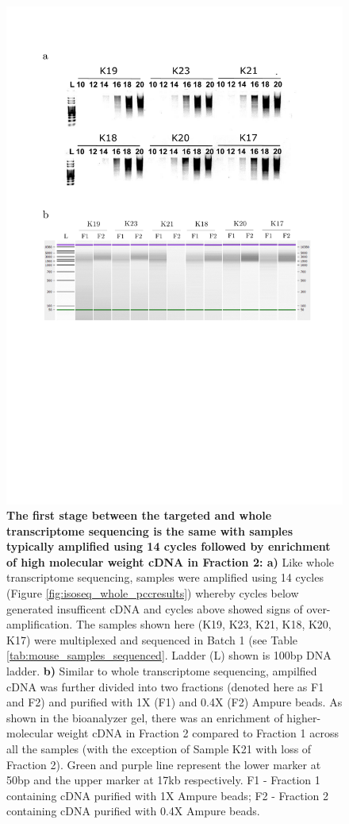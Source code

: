 \begin{figure}[htp]
	\centering
	\vspace{20pt}
	\includegraphics[page=1,trim={0 16cm 0 4cm},clip,scale = 0.45]{Figures/TargetedLabResults.pdf}
	\captionsetup{width=0.95\textwidth}
	\caption[Iso-Seq Targeted Transcriptome - cDNA amplification and purification]%
	{\textbf{The first stage between the targeted and whole transcriptome sequencing is the same with samples typically amplified using 14 cycles followed by enrichment of high molecular weight cDNA in Fraction 2: a)} Like whole transcriptome sequencing, samples were amplified using 14 cycles (Figure \ref{fig:isoseq_whole_pccresults}) whereby cycles below generated insufficent cDNA and cycles above showed signs of over-amplification. The samples shown here (K19, K23, K21, K18, K20, K17) were multiplexed and sequenced in Batch 1 (see Table \ref{tab:mouse_samples_sequenced}. Ladder (L) shown is 100bp DNA ladder. \textbf{b)} Similar to whole transcriptome sequencing, ampilfied cDNA was further divided into two fractions (denoted here as F1 and F2) and purified with 1X (F1) and 0.4X (F2) Ampure beads. As shown in the bioanalyzer gel, there was an enrichment of higher-molecular weight cDNA in Fraction 2 compared to Fraction 1 across all the samples (with the exception of Sample K21 with loss of Fraction 2). Green and purple line represent the lower marker at 50bp and the upper marker at 17kb respectively. F1 - Fraction 1 containing cDNA purified with 1X Ampure beads; F2 - Fraction 2 containing cDNA purified with 0.4X Ampure beads.}

\end{figure}
